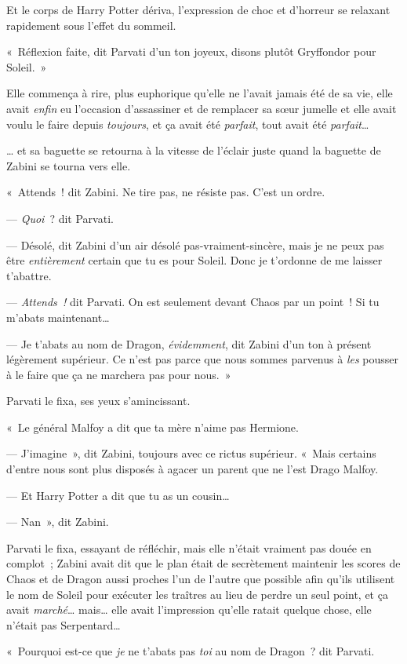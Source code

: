 Et le corps de Harry Potter dériva, l'expression de choc et d'horreur se relaxant rapidement sous l'effet du sommeil.

«~Réflexion faite, dit Parvati d'un ton joyeux, disons plutôt Gryffondor pour Soleil.~»

Elle commença à rire, plus euphorique qu'elle ne l'avait jamais été de sa vie, elle avait \emph{enfin} eu l'occasion d'assassiner et de remplacer sa sœur jumelle et elle avait voulu le faire depuis \emph{toujours}, et ça avait été \emph{parfait}, tout avait été \emph{parfait}…

… et sa baguette se retourna à la vitesse de l'éclair juste quand la baguette de Zabini se tourna vers elle.

«~Attends~! dit Zabini.
Ne tire pas, ne résiste pas.
C'est un ordre.

--- \emph{Quoi}~? dit Parvati.

--- Désolé, dit Zabini d'un air désolé pas-vraiment-sincère, mais je ne peux pas être \emph{entièrement} certain que tu es pour Soleil.
Donc je t'ordonne de me laisser t'abattre.

--- \emph{Attends~!} dit Parvati.
On est seulement devant Chaos par un point~!
Si tu m'abats maintenant…

--- Je t'abats au nom de Dragon, \emph{évidemment}, dit Zabini d'un ton à présent légèrement supérieur.
Ce n'est pas parce que nous sommes parvenus à \emph{les} pousser à le faire que ça ne marchera pas pour nous.~»

Parvati le fixa, ses yeux s'amincissant.

«~Le général Malfoy a dit que ta mère n'aime pas Hermione.

--- J'imagine~», dit Zabini, toujours avec ce rictus supérieur.
«~Mais certains d'entre nous sont plus disposés à agacer un parent que ne l'est Drago Malfoy.

--- Et Harry Potter a dit que tu as un cousin…

--- Nan~», dit Zabini.

Parvati le fixa, essayant de réfléchir, mais elle n'était vraiment pas douée en complot~; Zabini avait dit que le plan était de secrètement maintenir les scores de Chaos et de Dragon aussi proches l'un de l'autre que possible afin qu'ils utilisent le nom de Soleil pour exécuter les traîtres au lieu de perdre un seul point, et ça avait \emph{marché}… mais… elle avait l'impression qu'elle ratait quelque chose, elle n'était pas Serpentard…

«~Pourquoi est-ce que \emph{je} ne t'abats pas \emph{toi} au nom de Dragon~? dit Parvati.

